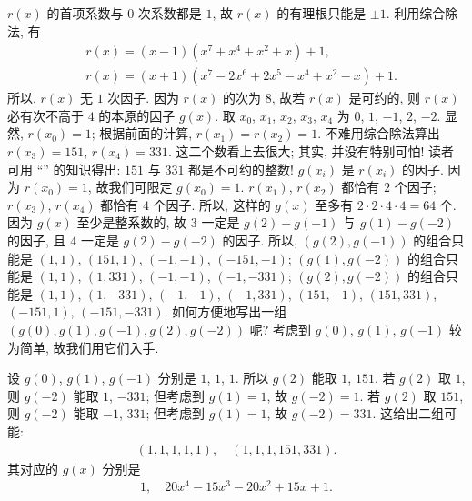 \begin{example}
    $r(x)$ 的首项系数与 $0$ 次系数都是 $1$, 故 $r(x)$ 的有理根只能是 $\pm 1$. 利用综合除法, 有
    \begin{align*}
         & r(x) = (x-1) (x^7+x^4+x^2+x) + 1,             \\
         & r(x) = (x+1) (x^7-2 x^6+2 x^5-x^4+x^2-x) + 1.
    \end{align*}
    所以, $r(x)$ 无 $1$ 次因子. 因为 $r(x)$ 的次为 $8$, 故若 $r(x)$ 是可约的, 则 $r(x)$ 必有次不高于 $4$ 的本原的因子 $g(x)$. 取 $x_0$, $x_1$, $x_2$, $x_3$, $x_4$ 为 $0$, $1$, $-1$, $2$, $-2$. 显然, $r(x_0) = 1$; 根据前面的计算, $r(x_1) = r(x_2) = 1$. 不难用综合除法算出 $r(x_3) = 151$, $r(x_4) = 331$. 这二个数看上去很大; 其实, 并没有特别可怕! 读者可用 ``\FactorizationOfIntegers'' 的知识得出: $151$ 与 $331$ 都是不可约的整数! $g(x_i)$ 是 $r(x_i)$ 的因子. 因为 $r(x_0) = 1$, 故我们可限定 $g(x_0) = 1$. $r(x_1)$, $r(x_2)$ 都恰有 $2$ 个因子; $r(x_3)$, $r(x_4)$ 都恰有 $4$ 个因子. 所以, 这样的 $g(x)$ 至多有 $2 \cdot 2 \cdot 4 \cdot 4 = 64$ 个. 因为 $g(x)$ 至少是整系数的, 故 $3$ 一定是 $g(2) - g(-1)$ 与 $g(1) - g(-2)$ 的因子, 且 $4$ 一定是 $g(2) - g(-2)$ 的因子. 所以, $(g(2), g(-1))$ 的组合只能是 $(1, 1)$, $(151, 1)$, $(-1, -1)$, $(-151, -1)$; $(g(1), g(-2))$ 的组合只能是 $(1, 1)$, $(1, 331)$, $(-1, -1)$, $(-1, -331)$; $(g(2), g(-2))$ 的组合只能是 $(1, 1)$, $(1, -331)$, $(-1, -1)$, $(-1, 331)$, $(151, -1)$, $(151, 331)$, $(-151, 1)$, $(-151, -331)$. 如何方便地写出一组 $(g(0), g(1), g(-1), g(2), g(-2))$ 呢? 考虑到 $g(0)$, $g(1)$, $g(-1)$ 较为简单, 故我们用它们入手.

    设 $g(0)$, $g(1)$, $g(-1)$ 分别是 $1$, $1$, $1$. 所以 $g(2)$ 能取 $1$, $151$. 若 $g(2)$ 取 $1$, 则 $g(-2)$ 能取 $1$, $-331$; 但考虑到 $g(1) = 1$, 故 $g(-2) = 1$. 若 $g(2)$ 取 $151$, 则 $g(-2)$ 能取 $-1$, $331$; 但考虑到 $g(1) = 1$, 故 $g(-2) = 331$. 这给出二组可能:
    \begin{align*}
        (1,1,1,1,1), \quad (1,1,1,151,331).
    \end{align*}
    其对应的 $g(x)$ 分别是
    \begin{align*}
        1, \quad 20 x^4-15 x^3-20 x^2+15 x+1.
    \end{align*}


\end{example}
